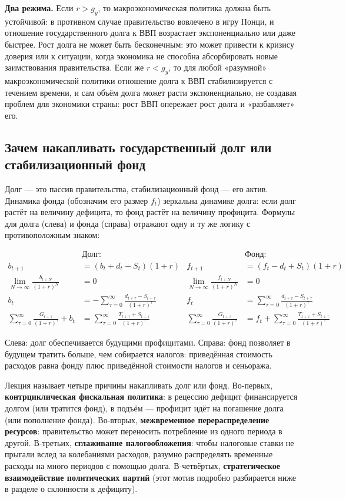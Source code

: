 \documentclass[11pt,a4paper]{article}
\begin{document}
\textbf{Два режима.} Если $r>g_y$, то макроэкономическая политика должна быть устойчивой: в противном случае правительство вовлечено в игру Понци, и отношение государственного долга к ВВП возрастает экспоненциально или даже быстрее. Рост долга не может быть бесконечным: это может привести к кризису доверия или к ситуации, когда экономика не способна абсорбировать новые заимствования правительства. Если же $r<g_y$, то для любой «разумной» макроэкономической политики отношение долга к ВВП стабилизируется с течением времени, и сам объём долга может расти экспоненциально, не создавая проблем для экономики страны: рост ВВП опережает рост долга и «разбавляет» его.

\subsection{Зачем накапливать государственный долг или стабилизационный фонд}

Долг --- это пассив правительства, стабилизационный фонд --- его актив. Динамика фонда (обозначим его размер $f_t$) зеркальна динамике долга: если долг растёт на величину дефицита, то фонд растёт на величину профицита. Формулы для долга (слева) и фонда (справа) отражают одну и ту же логику с противоположным знаком:
\begin{formulabox}
\begin{align*}
&\textbf{Долг:} & &\textbf{Фонд:}\\
b_{t+1}&=(b_t+d_t-S_t)(1+r) & f_{t+1}&=(f_t-d_t+S_t)(1+r)\\
\lim_{N\to\infty}\frac{b_{t+N}}{(1+r)^N}&=0 & \lim_{N\to\infty}\frac{f_{t+N}}{(1+r)^N}&=0\\
b_t&=-\sum_{\tau=0}^{\infty}\frac{d_{t+\tau}-S_{t+\tau}}{(1+r)^\tau} & f_t&=\sum_{\tau=0}^{\infty}\frac{d_{t+\tau}-S_{t+\tau}}{(1+r)^\tau}\\
\sum_{\tau=0}^{\infty}\frac{G_{t+\tau}}{(1+r)^\tau}+b_t&=\sum_{\tau=0}^{\infty}\frac{T_{t+\tau}+S_{t+\tau}}{(1+r)^\tau} & \sum_{\tau=0}^{\infty}\frac{G_{t+\tau}}{(1+r)^\tau}&=f_t+\sum_{\tau=0}^{\infty}\frac{T_{t+\tau}+S_{t+\tau}}{(1+r)^\tau}
\end{align*}
\end{formulabox}
Слева: долг обеспечивается будущими профицитами. Справа: фонд позволяет в будущем тратить больше, чем собирается налогов: приведённая стоимость расходов равна фонду плюс приведённой стоимости налогов и сеньоража.

Лекция называет четыре причины накапливать долг или фонд. Во-первых, \textbf{контрциклическая фискальная политика}: в рецессию дефицит финансируется долгом (или тратится фонд), в подъём --- профицит идёт на погашение долга (или пополнение фонда). Во-вторых, \textbf{межвременное перераспределение ресурсов}: правительство может переносить потребление из одного периода в другой. В-третьих, \textbf{сглаживание налогообложения}: чтобы налоговые ставки не прыгали вслед за колебаниями расходов, разумно распределять временные расходы на много периодов с помощью долга. В-четвёртых, \textbf{стратегическое взаимодействие политических партий} (этот мотив подробно разбирается ниже в разделе о склонности к дефициту).
\end{document}
